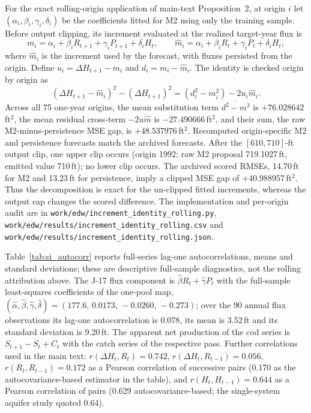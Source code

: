 \documentclass[preprint,11pt,authoryear]{elsarticle}
\theoremstyle{remark}
\begin{document}
For the exact rolling-origin application of main-text Proposition~2, at origin $i$ let $(\alpha_i,\beta_i,\gamma_i,\delta_i)$ be the coefficients fitted for M2 using only the training sample. Before output clipping, its increment evaluated at the realized target-year flux is
\[
m_i=\alpha_i+\beta_iR_{t+1}+\gamma_iP_{t+1}+\delta_iH_t,
\qquad \hat m_i=\alpha_i+\beta_iR_t+\gamma_iP_t+\delta_iH_t,
\]
where $\hat m_i$ is the increment used by the forecast, with fluxes persisted from the origin. Define $u_i=\Delta H_{t+1}-m_i$ and $d_i=m_i-\hat m_i$. The identity is checked origin by origin as
\[
(\Delta H_{t+1}-\hat m_i)^2-(\Delta H_{t+1})^2
= (d_i^2-m_i^2)-2u_i\hat m_i.
\]
Across all 75 one-year origins, the mean substitution term $\overline{d^2-m^2}$ is $+76.028642$\,ft$^2$, the mean residual cross-term $-2\overline{u\hat m}$ is $-27.490666$\,ft$^2$, and their sum, the raw M2-minus-persistence MSE gap, is $+48.537976$\,ft$^2$. Recomputed origin-specific M2 and persistence forecasts match the archived forecasts. After the $[610,710]$-ft output clip, one upper clip occurs (origin 1992; raw M2 proposal 719.1027\,ft, emitted value 710\,ft); no lower clip occurs. The archived scored RMSEs, 14.70\,ft for M2 and 13.23\,ft for persistence, imply a clipped MSE gap of $+40.988957$\,ft$^2$. Thus the decomposition is exact for the un-clipped fitted increments, whereas the output cap changes the scored difference. The implementation and per-origin audit are in \texttt{work/edw/increment\_identity\_rolling.py}, \texttt{work/edw/results/increment\_identity\_rolling.csv} and \texttt{work/edw/results/increment\_identity\_rolling.json}.

Table~\ref{tab:si_autocorr} reports full-series lag-one autocorrelations, means and standard deviations; these are descriptive full-sample diagnostics, not the rolling attribution above. The J-17 flux component is $\hat\beta R_t+\hat\gamma P_t$ with the full-sample least-squares coefficients of the one-pool map, $(\hat\alpha,\hat\beta,\hat\gamma,\hat\delta)=(177.6,\,0.0173,\,-0.0260,\,-0.273)$; over the 90 annual flux observations its lag-one autocorrelation is 0.078, its mean is 3.52\,ft and its standard deviation is 9.20\,ft. The apparent net production of the cod series is $S_{t+1}-S_t+C_t$ with the catch series of the respective pass. Further correlations used in the main text: $r(\Delta H_t,R_t)=0.742$, $r(\Delta H_t,R_{t-1})=0.056$, $r(R_t,R_{t-1})=0.172$ as a Pearson correlation of successive pairs (0.170 as the autocovariance-based estimator in the table), and $r(H_t,H_{t-1})=0.644$ as a Pearson correlation of pairs (0.629 autocovariance-based; the single-system aquifer study quoted 0.64).
\end{document}
